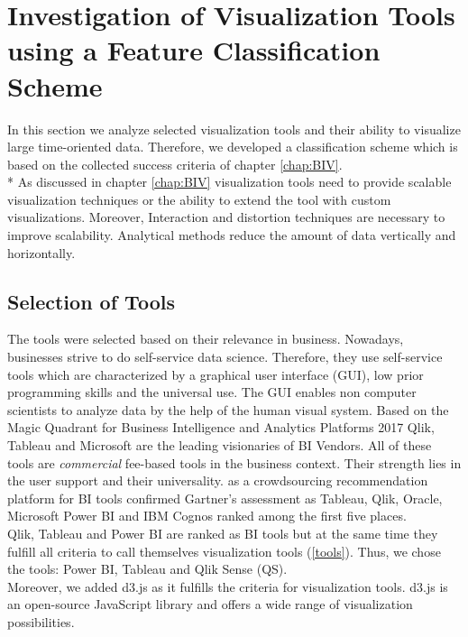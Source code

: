 \chapter{Investigation of Visualization Tools using a Feature Classification Scheme}
\label{chap:Tools}

In this section we analyze selected visualization tools and their ability to visualize large time-oriented data. Therefore, we developed a classification scheme which is based on the collected success criteria of chapter \ref{chap:BIV}. \\*
As discussed in chapter \ref{chap:BIV} visualization tools need to provide scalable visualization techniques or the ability to extend the tool with custom visualizations. Moreover, Interaction and distortion techniques are necessary to improve scalability. Analytical methods reduce the amount of data vertically and horizontally. 
\section{Selection of Tools}\label{tool:selection}
The tools were selected based on their relevance in business. Nowadays, businesses strive to do self-service data science. Therefore, they use self-service tools which are characterized by a graphical user interface (GUI), low prior programming skills and the universal use. The GUI enables non computer scientists to analyze data by the help of the human visual system. Based on the Magic Quadrant for Business Intelligence and Analytics Platforms 2017 \cite{Sallam2017} Qlik, Tableau and Microsoft are the leading visionaries of BI Vendors. All of these tools are \textit{commercial} fee-based tools in the business context. Their strength lies in the user support and their universality. \cite{ITCentralStation} as a crowdsourcing recommendation platform for BI tools confirmed Gartner's assessment as Tableau, Qlik, Oracle, Microsoft Power BI and IBM Cognos ranked among the first five places. \\
Qlik, Tableau and Power BI are ranked as BI tools but at the same time they fulfill all criteria to call themselves visualization tools (\ref{tools}).
Thus, we chose the tools: Power BI, Tableau and Qlik Sense (QS).\\
Moreover, we added d3.js as it fulfills the criteria for visualization tools. d3.js is an open-source JavaScript library and offers a wide range of visualization possibilities. \\




